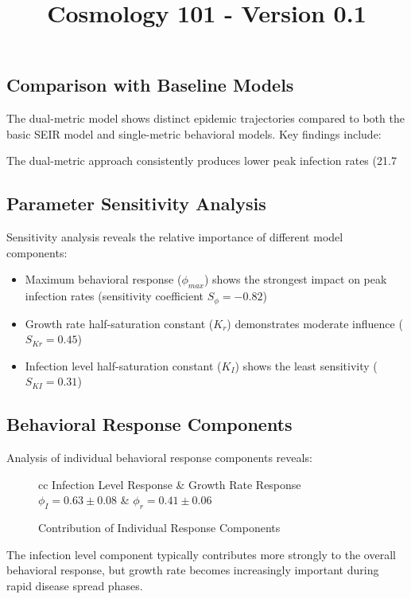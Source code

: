 \documentclass{article}\usepackage{graphicx} \usepackage{amsmath} \usepackage{colortbl}\title{Cosmology 101 - Version 0.1}
\begin{document}
\subsection{Comparison with Baseline Models}

The dual-metric model shows distinct epidemic trajectories compared to both the basic SEIR model and single-metric behavioral models. Key findings include:


The dual-metric approach consistently produces lower peak infection rates (21.7%

\subsection{Parameter Sensitivity Analysis}

Sensitivity analysis reveals the relative importance of different model components:

\begin{itemize}
\item Maximum behavioral response ($\phi_{max}$) shows the strongest impact on peak infection rates (sensitivity coefficient $S_{\phi} = -0.82$)
\item Growth rate half-saturation constant ($K_r$) demonstrates moderate influence ($S_{Kr} = 0.45$)
\item Infection level half-saturation constant ($K_I$) shows the least sensitivity ($S_{KI} = 0.31$)
\end{itemize}

\subsection{Behavioral Response Components}

Analysis of individual behavioral response components reveals:

\begin{figure}[h]
\caption{Contribution of Individual Response Components}
\begin{tabular}{cc}
Infection Level Response & Growth Rate Response \
$\phi_I = 0.63 \pm 0.08$ & $\phi_r = 0.41 \pm 0.06$ \
\end{tabular}
\end{figure}

The infection level component typically contributes more strongly to the overall behavioral response, but growth rate becomes increasingly important during rapid disease spread phases.
\end{document}
